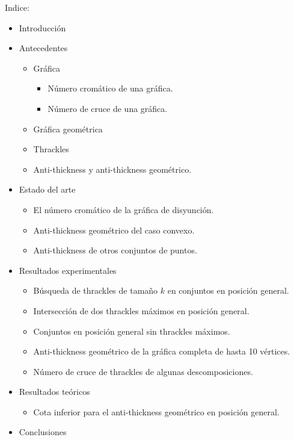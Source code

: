 \documentclass[12pt, letterpaper]{article}
\begin{document}
Indice:
\begin{itemize}
  \item Introducción
  \item Antecedentes
    \begin{itemize}
      \item Gráfica
      \begin{itemize}
        \item Número cromático de una gráfica.
        \item Número de cruce de una gráfica.
      \end{itemize}
      \item Gráfica geométrica
      \item Thrackles
      \item Anti-thickness y anti-thickness geométrico.
    \end{itemize}
  \item Estado del arte
    \begin{itemize}
      \item El número cromático de la gráfica de disyunción.
      \item Anti-thickness geométrico del caso convexo.
      \item Anti-thickness de otros conjuntos de puntos.
    \end{itemize}
  \item Resultados experimentales
    \begin{itemize}
      \item Búsqueda de thrackles de tamaño $k$ en conjuntos en posición general.
      \item Intersección de dos thrackles máximos en posición general.
      \item Conjuntos en posición general sin thrackles máximos.
      \item Anti-thickness geométrico de la gráfica completa de hasta 10 vértices.
      \item Número de cruce de thrackles de algunas descomposiciones.
    \end{itemize}
  \item Resultados teóricos
    \begin{itemize}
      \item Cota inferior para el anti-thickness geométrico en posición general.
    \end{itemize}
  \item Conclusiones
\end{itemize}
\end{document}

